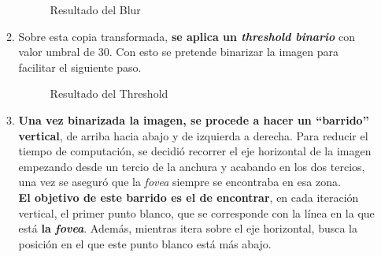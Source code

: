 \begin{enumerate}
\begin{enumerate}[label*=\arabic*.]
      \begin{figure}[H]
        \caption{Resultado del Blur}
        \centering \setlength\fboxsep{0pt} \setlength\fboxrule{0.5pt}
      \end{figure}

  \item Sobre esta copia transformada, \textbf{se aplica un
      \emph{threshold binario}} con valor umbral de $30$. Con esto se
    pretende binarizar la imagen para facilitar el siguiente paso.

      \begin{figure}[H]
        \caption{Resultado del Threshold}
        \centering \setlength\fboxsep{0pt} \setlength\fboxrule{0.5pt}
      \end{figure}

  \item \textbf{Una vez binarizada la imagen, se procede a hacer un
      ``barrido'' vertical}, de arriba hacia abajo y de izquierda a
    derecha. Para reducir el tiempo de computación, se decidió
    recorrer el eje horizontal de la imagen empezando desde un tercio
    de la anchura y acabando en los dos tercios, una vez se aseguró
    que la \emph{\gls{fovea}} siempre se encontraba en esa zona. \\
    \textbf{ El objetivo de este barrido es el de encontrar}, en cada
    iteración vertical, el primer punto blanco, que se corresponde con
    la línea en la que está \textbf{la \emph{\gls{fovea}}}. Además,
    mientras itera sobre el eje horizontal, busca la posición en el
    que este punto blanco está más abajo.


\end{enumerate}
\end{enumerate}
